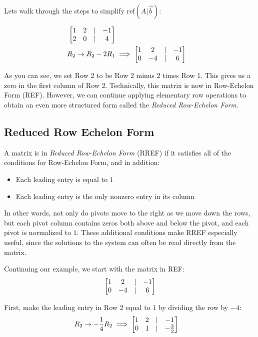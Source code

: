 Lets walk through the steps to simplify $\text{ref}(A\vert \vec{b})$:

\begin{align*}
\begin{bmatrix} 1 & 2 &\vert & -1 \\ 2 & 0 & \vert & 4 \end{bmatrix} \\
R_2 \rightarrow R_2 - 2R_1 &\implies \begin{bmatrix} 1 & 2 &\vert & -1 \\ 0 & -4 & \vert & 6 \end{bmatrix} \\
\end{align*}

As you can see, we set Row 2 to be Row 2 minus 2 times Row 1. This gives us a zero in the first column of Row 2. Technically, this matrix is now in Row-Echelon Form (REF). However, we can continue applying elementary row operations to obtain an even more structured form called the \emph{Reduced Row-Echelon Form}.

\subsection{Reduced Row Echelon Form}
A matrix is in \emph{Reduced Row-Echelon Form} (RREF) if it satisfies all of the conditions for Row-Echelon Form, and in addition:

\begin{itemize}
\item Each leading entry is equal to $1$
\item Each leading entry is the only nonzero entry in its column
\end{itemize}

In other words, not only do pivots move to the right as we move down the rows, but each pivot column contains zeros both above and below the pivot, and each pivot is normalized to $1$. These additional conditions make RREF especially useful, since the solutions to the system can often be read directly from the matrix.

Continuing our example, we start with the matrix in REF:
\begin{align*}
\begin{bmatrix} 1 & 2 &\vert & -1 \\ 0 & -4 & \vert & 6 \end{bmatrix}
\end{align*}

First, make the leading entry in Row 2 equal to $1$ by dividing the row by $-4$:
\begin{align*}
R_2 \rightarrow -\frac{1}{4}R_2 
&\implies 
\begin{bmatrix} 1 & 2 &\vert & -1 \\ 0 & 1 & \vert & -\frac{3}{2} \end{bmatrix}
\end{align*}

